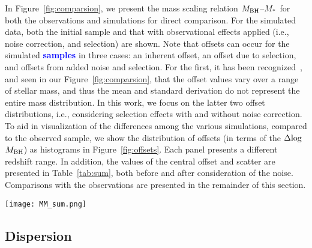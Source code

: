 \documentclass[twocolumn]{aastex631}
\newcommand{\blue}[1]{\textcolor{blue}{\bf #1}}
\def\smass{{$M_*$}}
\def\mbh{$M_{\rm BH}$}
\begin{document}
In Figure~\ref{fig:comparsion}, we present the mass scaling relation \mbh--\smass\ for both the observations and simulations for direct comparison. For the simulated data, both the initial sample and that with observational effects applied (i.e., noise correction, and selection) are shown. Note that offsets can occur for the simulated \blue{samples} in three cases: an inherent offset, an offset due to selection, and offsets from added noise and selection. For the first, it has been recognized~\citep[e.g.,][Figure 2]{Habouzit2021}, and seen in our Figure~\ref{fig:comparsion}, that the  offset values vary over a range of stellar mass, and thus the mean and standard derivation do not represent the entire mass distribution.
In this work, we focus on the latter two offset distributions, i.e., considering selection effects with and without noise correction. To aid in visualization of the differences among the various simulations, compared to the observed sample, we show the distribution of offsets (in terms of the $\Delta{\rm log}$\mbh) as histograms in Figure~\ref{fig:offsets}.  Each panel presents a different redshift range. In addition, the values of the central offset and scatter are presented 
in Table~\ref{tab:sum}, both before and after consideration of the noise. Comparisons with the observations are presented in the remainder of this section.

\begin{figure*}
\centering
\texttt{[image: MM\_sum.png]}
\caption{\label{fig:comparsion} 
Black hole mass versus stellar mass for both the observational (small orange circles) and simulated (small colored circles) samples. Each row pertains to a particular simulation as labelled. The panels, from left to right, show different redshift bins. The black line in each panel indicates the local relation adopted by~\citet{Ding2020}. The background cloud (in green and yellow with contours) shows the intrinsic simulation number density before injecting random noise and applying selection effects. The TNG100 and TNG300 appear to present similar results (see discussion section). \blue{Note that different sample adopt either a Chabrier or a Salpeter IMF for calculating the stellar mass, thus the \smass\ value for the observation and the local relation can be slightly different in each vertical plane.}
}
\end{figure*} 

\subsection{Dispersion}
\end{document}
